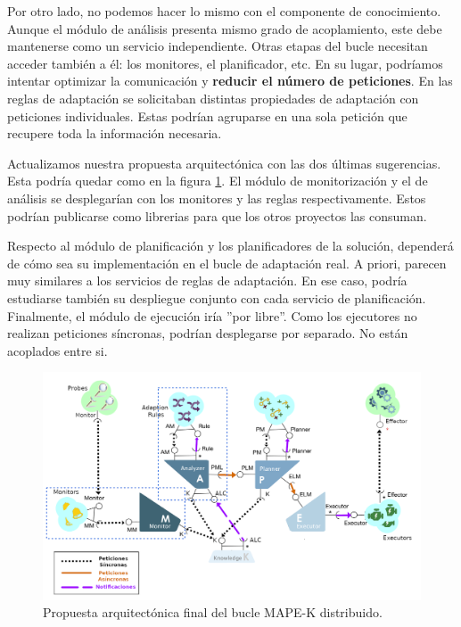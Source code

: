 Por otro lado, no podemos hacer lo mismo con el componente de conocimiento. Aunque el módulo de análisis presenta mismo grado de acoplamiento, este debe mantenerse como un servicio independiente. Otras etapas del bucle necesitan acceder también a él: los monitores, el planificador, etc. En su lugar, podríamos intentar optimizar la comunicación y \textbf{reducir el número de peticiones}. En las reglas de adaptación se solicitaban distintas propiedades de adaptación con peticiones individuales. Estas podrían agruparse en una sola petición que recupere toda la información necesaria.

Actualizamos nuestra propuesta arquitectónica con las dos últimas sugerencias. Esta podría quedar como en la figura \ref{fig:arquitectura-final}. El módulo de monitorización y el de análisis se desplegarían con los monitores y las reglas respectivamente. Estos podrían publicarse como librerias para que los otros proyectos las consuman.

Respecto al módulo de planificación y los planificadores de la solución, dependerá de cómo sea su implementación en el bucle de adaptación real. A priori, parecen muy similares a los servicios de reglas de adaptación. En ese caso, podría estudiarse también su despliegue conjunto con cada servicio de planificación. Finalmente, el módulo de ejecución iría ''por libre''. Como los ejecutores no realizan peticiones síncronas, podrían desplegarse por separado. No están acoplados entre si.

\begin{landscape}

  \begin{figure}[h!]
    \centering
    \includegraphics[scale=0.74]{cap_despliegue/images/arquitectura-final}
    \caption{Propuesta arquitectónica final del bucle MAPE-K distribuido.}
    \label{fig:arquitectura-final}
  \end{figure}

\end{landscape}

